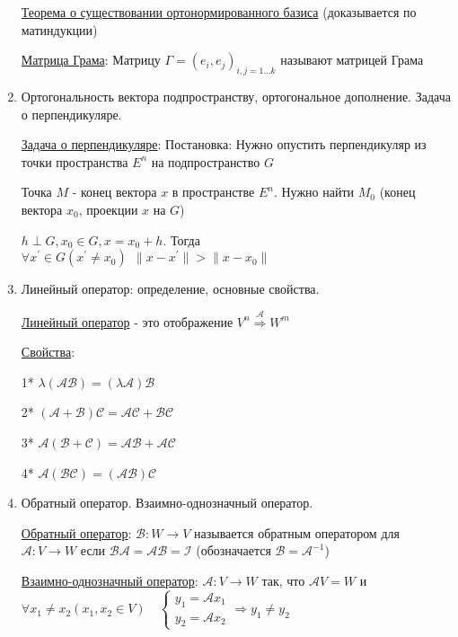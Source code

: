 \documentclass[12pt]{article}
\begin{document}
\begin{enumerate}
        \hyperlink{orthogonalbasisinspace}{Теорема о существовании ортонормированного базиса} (доказывается по матиндукции)


        \hyperlink{grammatrix}{Матрица Грама}: Матрицу $\Gamma = {(e_i, e_j)}_{i, j = 1\dots k}$ называют матрицей Грама

        \item Ортогональность вектора подпространству, ортогональное дополнение. Задача о перпендикуляре.

        \hyperlink{perpendicularproblem}{Задача о перпендикуляре}: Постановка: Нужно опустить перпендикуляр из точки пространства $E^n$ на подпространство $G$

        Точка $M$ - конец вектора $x$ в пространстве $E^n$.
        Нужно найти $M_0$ (конец вектора $x_0$, проекции $x$ на $G$)

        \Ths $h \perp G, x_0 \in G, x = x_0 + h$. Тогда $\forall x^\prime \in G (x^\prime \neq x_0) \ \ \|x - x^\prime\| > \|x - x_0\|$

        \item Линейный оператор: определение, основные свойства.

        \hyperlink{linearoperatordefinition}{Линейный оператор} - это отображение $V^n \stackrel{\mathcal{A}}{\Longrightarrow} W^m$

        \hyperlink{linearoperatorproperties}{Свойства}:

        1* $\lambda (\mathcal{A}\mathcal{B}) = (\lambda \mathcal{A})\mathcal{B}$

        2* $(\mathcal{A} + \mathcal{B}) \mathcal{C} = \mathcal{A}\mathcal{C} + \mathcal{B}\mathcal{C}$

        3* $\mathcal{A} (\mathcal{B} + \mathcal{C}) = \mathcal{A}\mathcal{B} + \mathcal{A}\mathcal{C}$

        4* $\mathcal{A} (\mathcal{B}\mathcal{C}) = (\mathcal{A}\mathcal{B}) \mathcal{C}$


        \item Обратный оператор. Взаимно-однозначный оператор.

        \hyperlink{reverselinearoperator}{Обратный оператор}: $\mathcal{B} : W \rightarrow V$ называется обратным оператором для $\mathcal{A} : V \rightarrow W$
        если $\mathcal{B}\mathcal{A} = \mathcal{A}\mathcal{B} = \mathcal{I}$ (обозначается $\mathcal{B} = \mathcal{A}^{-1}$)

        \hyperlink{onetoonelinearoperator}{Взаимно-однозначный оператор}: $\mathcal{A} : V \rightarrow W$ так, что $\mathcal{A}V = W$ и $\forall x_1 \neq x_2 (x_1, x_2 \in V) \quad
        \begin{cases}y_1 = \mathcal{A}x_1 \\ y_2 = \mathcal{A}x_2\end{cases} \Longrightarrow y_1 \neq y_2$


\end{enumerate}
\end{document}
